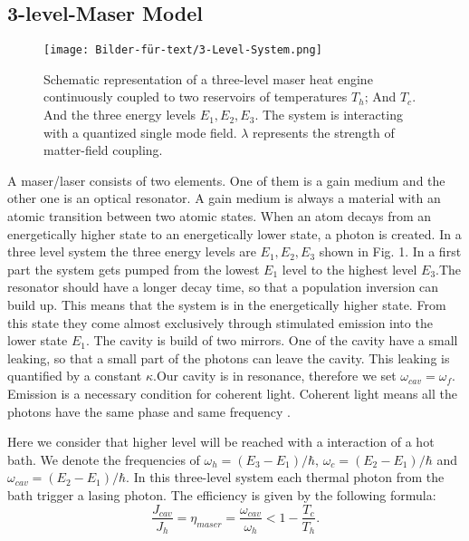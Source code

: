 \documentclass[12pt,a4paper]{article}
\begin{document}
\subsection{3-level-Maser Model}
\begin{figure}[h!] 
\texttt{[image: Bilder-für-text/3-Level-System.png]}
\caption{Schematic representation of a three-level maser heat engine
continuously coupled to two reservoirs of temperatures $T_h$;  And
$T_c$. And the three energy levels $E_1,E_2,E_3$. The
system is interacting with a quantized single mode field. $\lambda$
represents the strength of matter-field coupling.}
\end{figure}
A maser/laser consists of two elements. One of them is a gain medium and the other one is an optical resonator. A gain medium is always a material with an atomic transition between two atomic states. When an atom decays from an energetically higher state to an energetically lower state, a photon is created.
In a three level system the three energy levels are $E_1,E_2,E_3$ shown in Fig. 1. In a first part the system gets pumped from the lowest $E_1$ level to the highest level $ E_3$.The resonator should have a longer decay time, so that a population inversion can build up. This means that the system is in the energetically higher state. From this state they come almost exclusively through stimulated emission into the lower state $ E_1$.  The cavity is build of two mirrors. One of the cavity have a small leaking, so that a small part of the photons can leave the cavity. This leaking is quantified by a constant $\kappa$.Our cavity is in  resonance, therefore we set $\omega_{cav}=\omega_f$. 
Emission is a necessary condition for coherent light. Coherent light means all the photons have the same phase and same frequency \cite{Li2017}.
 
Here we consider that higher level will be reached with a interaction of a hot bath.  
We denote the frequencies of $\omega_h=(E_3-E_1)/\hbar$, $\omega_c=(E_2-E_1)/\hbar$ and $\omega_{cav}=(E_2-E_1)/\hbar$.
In this three-level system each thermal photon from the bath trigger a lasing photon. 
The efficiency is given by the following formula:
\begin{equation}
\frac{J_{cav}}{J_h}=\eta_{maser}=\frac{\omega_{cav}}{\omega_h}<1-\frac{T_c}{T_h}.
\end{equation}
\end{document}
